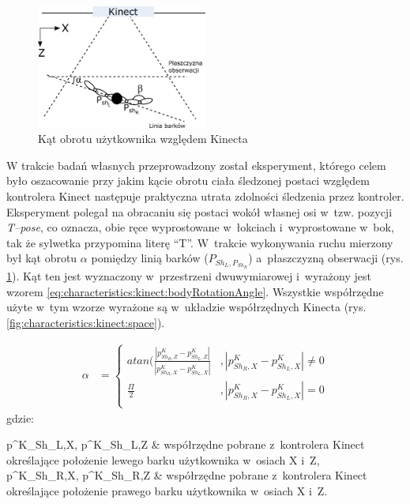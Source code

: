 \begin{savenotes}
	\begin{figure}[!htb]
		\centering
		\includegraphics[width=0.5\textwidth]{images/kinectAngle.png}
		\caption{Kąt obrotu użytkownika względem Kinecta}
		\label{fig:characteristics:kinect:bodyRotationAngle}
	\end{figure}
\end{savenotes}
																																					
W trakcie badań własnych przeprowadzony został eksperyment, którego celem było oszacowanie przy jakim kącie obrotu ciała śledzonej postaci względem kontrolera Kinect następuje praktyczna utrata zdolności śledzenia przez kontroler. Eksperyment polegał na obracaniu się postaci wokół własnej osi w~tzw. pozycji \emph{T--pose}, co oznacza, obie ręce wyprostowane w~łokciach i~wyprostowane w~bok, tak że sylwetka przypomina literę "`T"'. W~trakcie wykonywania ruchu mierzony był kąt obrotu $\alpha$ pomiędzy linią barków ($P_{{Sh}_L, P_{{Sh}_R}}$) a~płaszczyzną obserwacji (rys. \ref{fig:characteristics:kinect:bodyRotationAngle}). Kąt ten jest wyznaczony w~przestrzeni dwuwymiarowej i~wyrażony jest wzorem \ref{eq:characteristics:kinect:bodyRotationAngle}. Wszystkie współrzędne użyte w~tym wzorze wyrażone są w~układzie współrzędnych Kinecta (rys. \ref{fig:characteristics:kinect:space}).
																																			
\begin{equation}
	\label{eq:characteristics:kinect:bodyRotationAngle}
	\begin{split}
		\alpha &= 
		\begin{cases} 
			atan(\frac{|p^K_{{Sh}_R,Z} - p^K_{{Sh}_L,Z}|}{|p^K_{{Sh}_R,X} - p^K_{{Sh}_L,X}|} & , |p^K_{{Sh}_R,X} - p^K_{{Sh}_L,X}| \neq 0 \\
			\frac{\Pi}{2}                                                                    & , |p^K_{{Sh}_R,X} - p^K_{{Sh}_L,X}| = 0    \\		
		\end{cases}
	\end{split}
\end{equation}
gdzie:
\begin{conditions}
	p^K_{{Sh}_L,X}, p^K_{{Sh}_L,Z}			& współrzędne pobrane z~kontrolera Kinect określające położenie lewego barku użytkownika w~osiach X i~Z,\\
	p^K_{{Sh}_R,X}, p^K_{{Sh}_R,Z}			& współrzędne pobrane z~kontrolera Kinect określające położenie prawego barku użytkownika w~osiach X i~Z.\\
\end{conditions}
																																					
